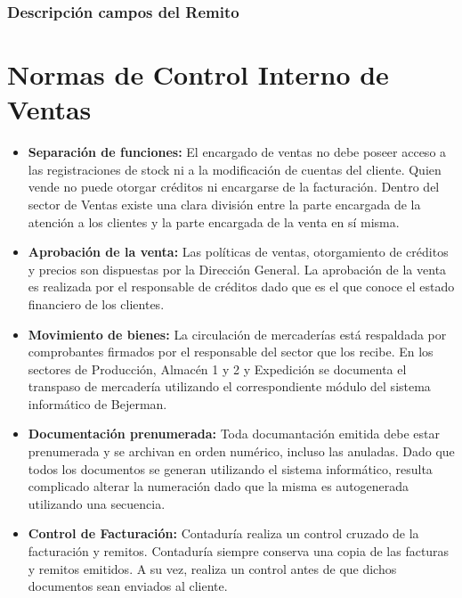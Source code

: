 \subsubsection{Descripci\'on campos del Remito}

\pagebreak
\section{Normas de Control Interno de Ventas}
\begin{itemize}
 \item	{\bf Separaci\'on de funciones: } El encargado de ventas no debe poseer acceso a las registraciones de stock ni a la modificaci\'on de cuentas del cliente.
Quien vende no puede otorgar cr\'editos ni encargarse de la facturaci\'on. Dentro del sector de Ventas existe una clara divisi\'on entre la parte encargada de la atenci\'on a los clientes 
y la parte encargada de la venta en s\'i misma.
  \item	{\bf Aprobaci\'on de la venta: } Las pol\'iticas de ventas, otorgamiento de cr\'editos y precios son dispuestas por la Direcci\'on General.
La aprobaci\'on de la venta es realizada por el responsable de cr\'editos dado que es el que conoce el estado financiero de los clientes.
  \item	{\bf Movimiento de bienes: } La circulaci\'on de mercader\'ias est\'a respaldada por comprobantes firmados por el responsable del sector que los recibe. En los sectores de Producci\'on, 
Almac\'en 1 y 2 y Expedici\'on se documenta el transpaso de mercader\'ia utilizando el correspondiente m\'odulo del sistema inform\'atico de Bejerman.
  \item	{\bf Documentaci\'on prenumerada: } Toda documantaci\'on emitida debe estar prenumerada y se archivan en orden num\'erico, incluso las anuladas. Dado que todos los documentos se generan 
utilizando el sistema inform\'atico, resulta complicado alterar la numeraci\'on dado que la misma es autogenerada utilizando una secuencia.
  \item	{\bf Control de Facturaci\'on: } Contadur\'ia realiza un control cruzado de la facturaci\'on y remitos. Contadur\'ia siempre conserva una copia de las facturas y remitos emitidos. 
A su vez, realiza un control antes de que dichos documentos sean enviados al cliente.
\end{itemize}
